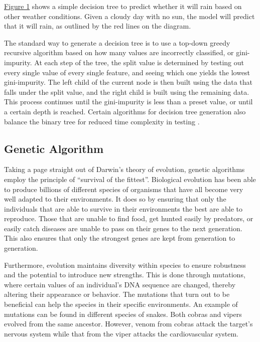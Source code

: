 \documentclass[12pt]{article}
\begin{document}
\hyperref[fig:decisiontree]{Figure 1} shows a simple decision tree to predict whether it will rain based on other weather conditions. Given a cloudy day with no sun, the model will predict that it will rain, as outlined by the red lines on the diagram.


The standard way to generate a decision tree is to use a top-down greedy recursive algorithm based on how many values are incorrectly classified, or gini-impurity. At each step of the tree, the split value is determined by testing out every single value of every single feature, and seeing which one yields the lowest gini-impurity. The left child of the current node is then built using the data that falls under the split value, and the right child is built using the remaining data. This process continues until the gini-impurity is less than a preset value, or until a certain depth is reached. Certain algorithms for decision tree generation also balance the binary tree for reduced time complexity in testing \cite{dt_skl_doc}.

\subsection{Genetic Algorithm}

Taking a page straight out of Darwin's theory of evolution, genetic algorithms employ the principle of ``survival of the fittest''. Biological evolution has been able to produce billions \cite{Sweetlove_2011} of different species of organisms that have all become very well adapted to their environments. It does so by ensuring that only the individuals that are able to survive in their environments the best are able to reproduce. Those that are unable to find food, get hunted easily by predators, or easily catch diseases are unable to pass on their genes to the next generation. This also ensures that only the strongest genes are kept from generation to generation.

Furthermore, evolution maintains diversity within species to ensure robustness and the potential to introduce new strengths. This is done through mutations, where certain values of an individual's DNA sequence are changed, thereby altering their appearance or behavior. The mutations that turn out to be beneficial can help the species in their specific environments. An example of mutations can be found in different species of snakes. Both cobras and vipers evolved from the same ancestor. However, venom from cobras attack the target's nervous system while that from the viper attacks the cardiovascular system.
\end{document}
